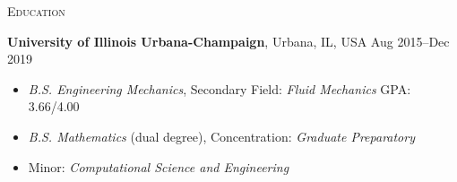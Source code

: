 \documentclass[10pt]{article}
\begin{document}
%
\begin{multicols}{2}
\textsc{\small Education}
\columnbreak

\textbf{University of Illinois Urbana-Champaign}, Urbana, IL, USA \hfill Aug 2015--Dec 2019

\vspace{-1.75em}
\begin{itemize}[label= ]
    \setlength\itemsep{-0.25em}
    \item {\sl B.S. Engineering Mechanics}, Secondary Field: {\sl Fluid Mechanics} \hfill GPA: 3.66/4.00
    \item {\sl B.S. Mathematics} (dual degree), Concentration: {\sl Graduate Preparatory}
    \item  Minor: {\sl Computational Science and Engineering}
\end{itemize}
\vspace{-2.0em}

\end{multicols}
\vspace{-1.5em}
\end{document}
